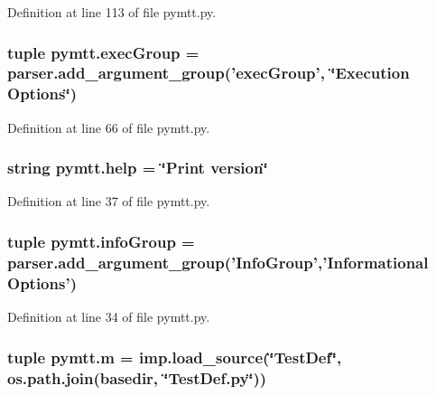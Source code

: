 Definition at line 113 of file pymtt.\-py.

\hypertarget{namespacepymtt_a0f52dbd5d46583e466305a708dea64a1}{
\subsubsection[{exec\-Group}]{\setlength{\rightskip}{0pt plus 5cm}tuple pymtt.\-exec\-Group = parser.\-add\-\_\-argument\-\_\-group('exec\-Group', \char`\"{}Execution Options\char`\"{})}}\label{namespacepymtt_a0f52dbd5d46583e466305a708dea64a1}


Definition at line 66 of file pymtt.\-py.

\hypertarget{namespacepymtt_a21e88c39af91deb569da20633d245b09}{
\subsubsection[{help}]{\setlength{\rightskip}{0pt plus 5cm}string pymtt.\-help = \char`\"{}Print version\char`\"{}}}\label{namespacepymtt_a21e88c39af91deb569da20633d245b09}


Definition at line 37 of file pymtt.\-py.

\hypertarget{namespacepymtt_a99ad2929ecc4e17f97670bed44f08c35}{
\subsubsection[{info\-Group}]{\setlength{\rightskip}{0pt plus 5cm}tuple pymtt.\-info\-Group = parser.\-add\-\_\-argument\-\_\-group('Info\-Group','Informational Options')}}\label{namespacepymtt_a99ad2929ecc4e17f97670bed44f08c35}


Definition at line 34 of file pymtt.\-py.

\hypertarget{namespacepymtt_ab13a60c31fa69917ce06c1a2631aaf02}{
\subsubsection[{m}]{\setlength{\rightskip}{0pt plus 5cm}tuple pymtt.\-m = imp.\-load\-\_\-source(\char`\"{}Test\-Def\char`\"{}, os.\-path.\-join({\bf basedir}, \char`\"{}Test\-Def.\-py\char`\"{}))}}\label{namespacepymtt_ab13a60c31fa69917ce06c1a2631aaf02}


